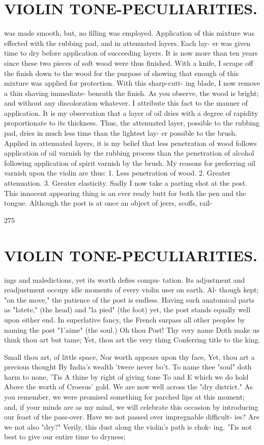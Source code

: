 \documentclass{article}
\begin{document}
\section*{VIOLIN TONE-PECULIARITIES.}
was made smooth, but, no filling was employed. Application of this mixture was effected with the rubbing pad, and in attenuated layers. Each lay- er was given time to dry before application of succeeding layers. It is now more than ten years since these two pieces of soft wood were thus finished. With a knife, I scrape off the finish down to the wood for the purpose of showing that enough of this mixture was applied for protection. With this sharp-cutt- ing blade, I now remove a thin shaving immediate- beneath the finish. As you observe, the wood is bright; and without any discoloration whatever. I attribute this fact to the manner of application. It is my observation that a layer of oil dries with a degree of rapidity proportionate to its thickness. Thus, the attenuated layer, possible to the rubbing pad, dries in much less time than the lightest lay- er possible to the brush. Applied in attenuated layers, it is my belief that less penetration of wood follows application of oil varnish by the rubbing process than the penetration of alcohol following application of spirit varnish by the brush. My reasons for preferring oil varnish upon the violin are thus: 1. Less penetration of wood. 2. Greater attenuation. 3. Greater elasticity. Sadly I now take a parting shot at the post. This innocent appearing thing is an ever ready butt for both the pen and the tongue. Although the post is at once an object of jeers, scoffs, rail-

275

\section*{VIOLIN TONE-PECULIARITIES.}
ings and maledictions, yet its worth defies compu- tation. Its adjustment and readjustment occupy idle moments of every violin user on earth. Al- though kept; "on the move," the patience of the post is endless. Having such anatomical parts as "latete," (the head) and "la pied" (the foot) yet, the post stands equally well upon either end. In superlative fancy, the French surpass all other peoples by naming the post "1'aime" (the soul.) Oh thou Post! Thy very name Doth make us think thou art but tame; Yet, thou art the very thing Conferring title to the king.

Small thou art, of little space, Nor worth appears upon thy face, Yet, thou art a precious thought By India's wealth 'twere never bo't. To name thee "soul" doth harm to none, 'Tis A thine by right of giving tone To and E which we do hold Above the worth of Croesus' gold. We are now well across the "dry district." As you remember, we were promised something for parched lips at this moment; and, if your minds are as my mind, we will celebrate this occasion by introducing our feast of the pass-over. Have we not passed over impregnable difficult- ies? Are we not also "dry?" Verily, this dust along the violin's path is chok- ing. 'Tis not best to give our entire time to dryness;
\end{document}
